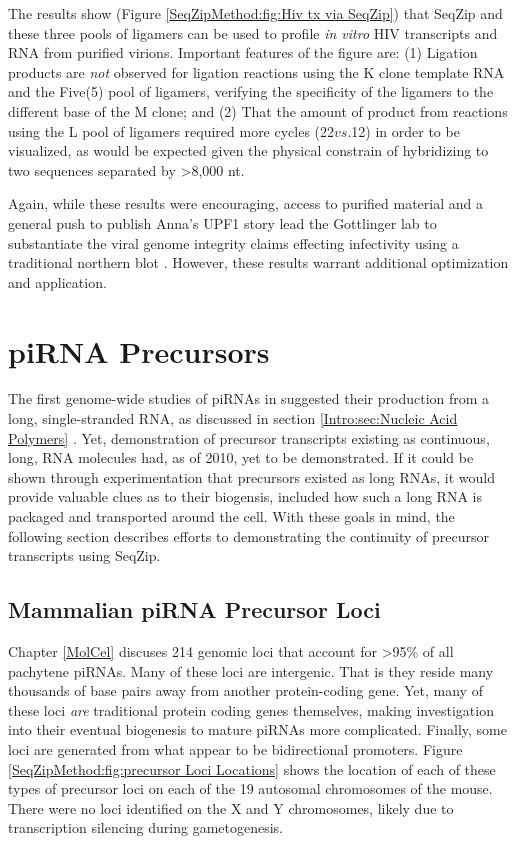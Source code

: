     The results show (Figure \ref{SeqZipMethod:fig:Hiv tx via SeqZip}) that SeqZip and these three pools of ligamers can be used to profile \textit{in vitro} HIV transcripts and RNA from purified virions. Important features of the figure are: (1) Ligation products are \textit{not} observed for ligation reactions using the K clone template RNA and the Five(5) pool of ligamers, verifying the specificity of the ligamers to the different base of the M clone; and (2) That the amount of product from reactions using the L pool of ligamers required more cycles (22$vs.$12) in order to be visualized, as would be expected given the physical constrain of hybridizing to two sequences separated by >8,000 nt. 

    Again, while these results were encouraging, access to purified material and a general push to publish Anna's UPF1 story lead the Gottlinger lab to substantiate the viral genome integrity claims effecting infectivity using a traditional northern blot \citep{Serquina2013}. However, these results warrant additional optimization and application.

\section{piRNA Precursors}
  \label{SeqZipMethod:sec:Demonstrating continuous precursor TX by SeqZip}

  The first genome-wide studies of piRNAs in \flies{} suggested their production from a long, single-stranded RNA, as discussed in section \ref{Intro:sec:Nucleic Acid Polymers} \citep{Brennecke2007,Gunawardane2007}. Yet, demonstration of precursor transcripts existing as continuous, long, RNA molecules had, as of 2010, yet to be demonstrated. If it could be shown through experimentation that precursors existed as long RNAs, it would provide valuable clues as to their biogensis, included how such a long RNA is packaged and transported around the cell. With these goals in mind, the following section describes efforts to demonstrating the continuity of precursor transcripts using SeqZip.

  \subsection{Mammalian piRNA Precursor Loci}
    \label{SeqZipMethod:subsec:Mammalian Loci of precursor Tx}

    Chapter \ref{MolCel} discuses 214 genomic loci that account for >95\% of all pachytene piRNAs. Many of these loci are intergenic. That is they reside many thousands of base pairs away from another protein-coding gene. Yet, many of these loci \textit{are} traditional protein coding genes themselves, making investigation into their eventual biogenesis to mature piRNAs more complicated. Finally, some loci are generated from what appear to be bidirectional promoters. Figure \ref{SeqZipMethod:fig:precursor Loci Locations} shows the location of each of these types of precursor loci on each of the 19 autosomal chromosomes of the mouse. There were no loci identified on the X and Y chromosomes, likely due to transcription silencing during gametogenesis. 

